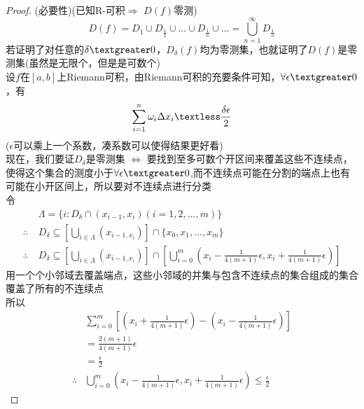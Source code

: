 \documentclass[12pt, a4paper, oneside]{ctexart}
\begin{document}
\begin{proof}
(必要性)(已知R-可积$\Rightarrow$ $D(f)$零测)
\begin{equation*}
    D(f)=D_1 \cup D_{\frac{1}{2}} \cup ... \cup D_{\frac{1}{n}} \cup ...=\bigcup_{n=1}^{\infty} D_{\frac{1}{n}}
\end{equation*}
若证明了对任意的$\delta \textgreater 0$，$D_{\delta}(f)$均为零测集，也就证明了$D(f)$是零测集(虽然是无限个，但是是可数个)\\
设$f$在$[a,b]$上Riemann可积，由Riemann可积的充要条件可知，$\forall \epsilon \textgreater 0$，有
\begin{equation*}
    \sum_{i=1}^{n}\omega_i \Delta x_i \textless \frac{\delta \epsilon}{2}
\end{equation*}
($\epsilon$可以乘上一个系数，凑系数可以使得结果更好看)\\
现在，我们要证$D_{\delta}$是零测集 $\Leftrightarrow$ 要找到至多可数个开区间来覆盖这些不连续点，使得这个集合的测度小于$\forall \epsilon \textgreater 0$,而不连续点可能在分割的端点上也有可能在小开区间上，所以要对不连续点进行分类\\
令
\begin{equation*}
   \begin{aligned}
        &\Lambda =\{i:D_{\delta} \cap (x_{i-1},x_i) (i=1,2,...,m)\}\\
        \therefore \;& D_{\delta} \subseteq \left [\bigcup_{i \in \Lambda}(x_{i-1,x_i})\right ] \cap  \{x_0,x_1,...,x_m \}\\
        \therefore \;&D_{\delta} \subseteq \left [\bigcup_{i \in \Lambda}(x_{i-1,x_i})\right ] \cap \left [\bigcup_{i=0}^{m}(x_i-\frac{1}{4(m+1)}\epsilon,x_i+\frac{1}{4(m+1)}\epsilon)\right]
   \end{aligned}
\end{equation*}
用一个个小邻域去覆盖端点，这些小邻域的并集与包含不连续点的集合组成的集合覆盖了所有的不连续点\\
所以
\begin{equation*}
   \begin{aligned}
         &\sum_{i=0}^{m}\left[(x_i+\frac{1}{4(m+1)}\epsilon)-(x_i-\frac{1}{4(m+1)}\epsilon)\right]\\
         &=\frac{2(m+1)}{4(m+1)}\epsilon\\
         &=\frac{\epsilon}{2}\\
         \therefore &\bigcup_{i=0}^{m}(x_i-\frac{1}{4(m+1)}\epsilon,x_i+\frac{1}{4(m+1)}\epsilon) \leq \frac{\epsilon}{2}
   \end{aligned}
\end{equation*}

\end{proof}
\end{document}
